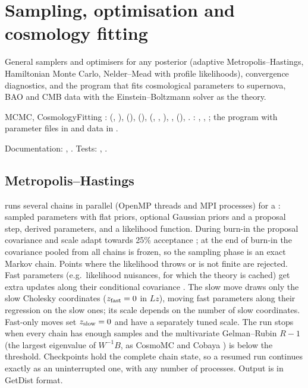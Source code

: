 \chapter{Sampling, optimisation and cosmology fitting}\label{ch:sampling-fitting}

General samplers and optimisers for any posterior (adaptive Metropolis--Hastings, Hamiltonian Monte Carlo, Nelder--Mead with profile
likelihoods), convergence diagnostics, and the program  that fits cosmological parameters to supernova, BAO and CMB data with
the Einstein--Boltzmann solver as the theory.

\begin{modulebox}{MCMC, CosmologyFitting}
:  (, ),  (), 
(),  (, , ), , 
(), . : , ,
; the program  with parameter files in  and data in .\par
Documentation: , . Tests: , .
\end{modulebox}

\section{Metropolis--Hastings}\label{sec:fit-mh}

 runs several chains in parallel (OpenMP threads and MPI processes) for a : sampled parameters with flat priors, optional
Gaussian priors and a proposal step, derived parameters, and a likelihood function. During burn-in the proposal covariance and scale adapt towards 25\%
acceptance \cite{Haario2001}; at the end of burn-in the covariance pooled from all chains is frozen, so the sampling phase is an exact Markov chain. Points
where the likelihood throws or is not finite are rejected. Fast parameters (e.g.\ likelihood nuisances, for which the theory is cached) get extra updates along
their conditional covariance \cite{Lewis2013}. The slow move draws only the slow Cholesky coordinates
($z_{\rm fast}=0$ in $Lz$), moving fast parameters along their regression on the slow ones; its scale depends on the
number of slow coordinates. Fast-only moves set $z_{\rm slow}=0$ and have a separately tuned scale. The run stops when every chain has enough samples and the multivariate Gelman--Rubin $R-1$ (the largest eigenvalue
of $W^{-1}B$, as CosmoMC and Cobaya \cite{Gelman1992}) is below the threshold. Checkpoints hold the complete chain state, so a resumed run continues exactly as
an uninterrupted one, with any number of processes. Output is in GetDist format.

